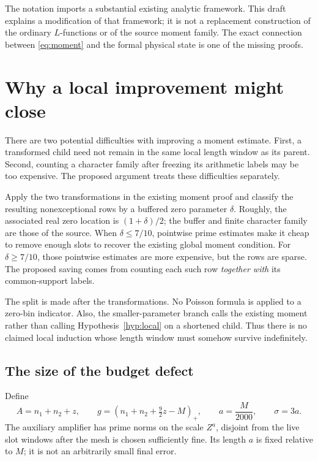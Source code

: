 \documentclass[11pt]{article}
\theoremstyle{definition}
\newcommand{\pos}[1]{(#1)_{+}}
\begin{document}
The notation imports a substantial existing analytic framework. This
draft explains a modification of that framework; it is not a replacement
construction of the ordinary $L$-functions or of the source moment family.
The exact connection between \eqref{eq:moment} and the formal physical
state is one of the missing proofs.

\section{Why a local improvement might close}\label{sec:idea}

There are two potential difficulties with improving a moment estimate.
First, a transformed child need not remain in the same local length
window as its parent. Second, counting a character family after freezing
its arithmetic labels may be too expensive. The proposed argument treats
these difficulties separately.

Apply the two transformations in the existing moment proof and classify
the resulting nonexceptional rows by a buffered zero parameter $\delta$.
Roughly, the associated real zero location is $(1+\delta)/2$; the
buffer and finite character family are those of the source. When
$\delta\le7/10$, pointwise prime estimates make it cheap to remove
enough slots to recover the existing global moment condition. For
$\delta\ge7/10$, those pointwise estimates are more expensive, but the
rows are sparse. The proposed saving comes from counting each such row
\emph{together with} its common-support labels.

The split is made after the transformations. No Poisson formula is
applied to a zero-bin indicator. Also, the smaller-parameter branch calls
the existing moment rather than calling Hypothesis~\ref{hyp:local} on a
shortened child. Thus there is no claimed local induction whose length
window must somehow survive indefinitely.

\subsection{The size of the budget defect}
Define
\begin{equation}\label{eq:budget}
 A=n_1+n_2+z,\qquad
 g=\pos{n_1+n_2+\tfrac92z-M},\qquad
 a=\frac M{2000},\qquad \sigma=3a.
\end{equation}
The auxiliary amplifier has prime norms on the scale $Z^a$, disjoint
from the live slot windows after the mesh is chosen sufficiently fine.
Its length $a$ is fixed relative to $M$; it is not an arbitrarily small
final error.
\end{document}
